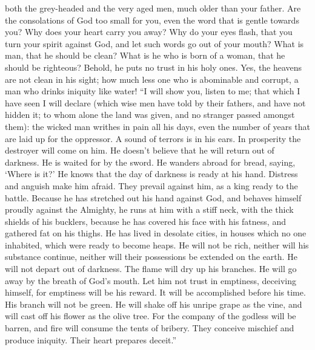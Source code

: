 both the grey-headed and the very aged men, much older than your father.
 Are the consolations of God too small for you, even the
word that is gentle towards you?  Why does your heart carry
you away? Why do your eyes flash,  that you turn your
spirit against God, and let such words go out of your mouth?
 What is man, that he should be clean? What is he who is
born of a woman, that he should be righteous?  Behold, he
puts no trust in his holy ones. Yes, the heavens are not clean in his
sight;  how much less one who is abominable and corrupt, a
man who drinks iniquity like water!  ``I will show you,
listen to me; that which I have seen I will declare  (which
wise men have told by their fathers, and have not hidden it;
 to whom alone the land was given, and no stranger passed
amongst them):  the wicked man writhes in pain all his
days, even the number of years that are laid up for the oppressor.
 A sound of terrors is in his ears. In prosperity the
destroyer will come on him.  He doesn't believe that he
will return out of darkness. He is waited for by the sword.
 He wanders abroad for bread, saying, `Where is it?' He
knows that the day of darkness is ready at his hand. 
Distress and anguish make him afraid. They prevail against him, as a
king ready to the battle.  Because he has stretched out his
hand against God, and behaves himself proudly against the Almighty,
 he runs at him with a stiff neck, with the thick shields
of his bucklers,  because he has covered his face with his
fatness, and gathered fat on his thighs.  He has lived in
desolate cities, in houses which no one inhabited, which were ready to
become heaps.  He will not be rich, neither will his
substance continue, neither will their possessions be extended on the
earth.  He will not depart out of darkness. The flame will
dry up his branches. He will go away by the breath of God's mouth.
 Let him not trust in emptiness, deceiving himself, for
emptiness will be his reward.  It will be accomplished
before his time. His branch will not be green.  He will
shake off his unripe grape as the vine, and will cast off his flower as
the olive tree.  For the company of the godless will be
barren, and fire will consume the tents of bribery.  They
conceive mischief and produce iniquity. Their heart prepares deceit.''
